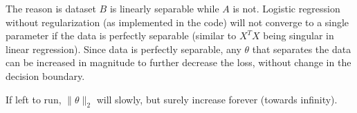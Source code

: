 \begin{answer}
  The reason is dataset $B$ is linearly separable while $A$ is not. Logistic
  regression without regularization (as implemented in the code) will not
  converge to a single parameter if the data is perfectly separable (similar to
  $X^TX$ being singular in linear regression). Since data is perfectly
  separable, any $\theta$ that separates the data can be increased in magnitude
  to further decrease the loss, without change in the decision boundary.

  If left to run, $\|\theta\|_2$ will slowly, but surely increase forever (towards infinity).

%
\end{answer}
